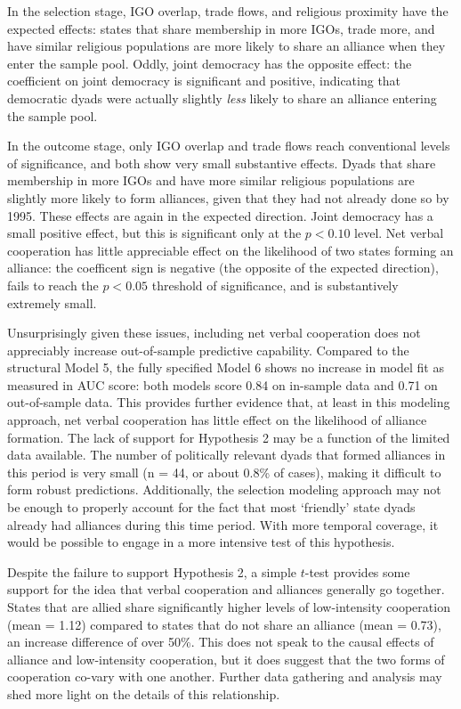 \documentclass[10pt,]{article}
\begin{document}
In the selection stage, IGO overlap, trade flows, and religious
proximity have the expected effects: states that share membership in
more IGOs, trade more, and have similar religious populations are more
likely to share an alliance when they enter the sample pool. Oddly,
joint democracy has the opposite effect: the coefficient on joint
democracy is significant and positive, indicating that democratic dyads
were actually slightly \emph{less} likely to share an alliance entering
the sample pool.

In the outcome stage, only IGO overlap and trade flows reach
conventional levels of significance, and both show very small
substantive effects. Dyads that share membership in more IGOs and have
more similar religious populations are slightly more likely to form
alliances, given that they had not already done so by 1995. These
effects are again in the expected direction. Joint democracy has a small
positive effect, but this is significant only at the \(p < 0.10\) level.
Net verbal cooperation has little appreciable effect on the likelihood
of two states forming an alliance: the coefficent sign is negative (the
opposite of the expected direction), fails to reach the \(p < 0.05\)
threshold of significance, and is substantively extremely small.

Unsurprisingly given these issues, including net verbal cooperation does
not appreciably increase out-of-sample predictive capability. Compared
to the structural Model 5, the fully specified Model 6 shows no increase
in model fit as measured in AUC score: both models score 0.84 on
in-sample data and 0.71 on out-of-sample data. This provides further
evidence that, at least in this modeling approach, net verbal
cooperation has little effect on the likelihood of alliance formation.
The lack of support for Hypothesis 2 may be a function of the limited
data available. The number of politically relevant dyads that formed
alliances in this period is very small (n = 44, or about 0.8\% of
cases), making it difficult to form robust predictions. Additionally,
the selection modeling approach may not be enough to properly account
for the fact that most `friendly' state dyads already had alliances
during this time period. With more temporal coverage, it would be
possible to engage in a more intensive test of this hypothesis.

Despite the failure to support Hypothesis 2, a simple \(t\)-test
provides some support for the idea that verbal cooperation and alliances
generally go together. States that are allied share significantly higher
levels of low-intensity cooperation (mean = 1.12) compared to states
that do not share an alliance (mean = 0.73), an increase difference of
over 50\%. This does not speak to the causal effects of alliance and
low-intensity cooperation, but it does suggest that the two forms of
cooperation co-vary with one another. Further data gathering and
analysis may shed more light on the details of this relationship.
\end{document}
